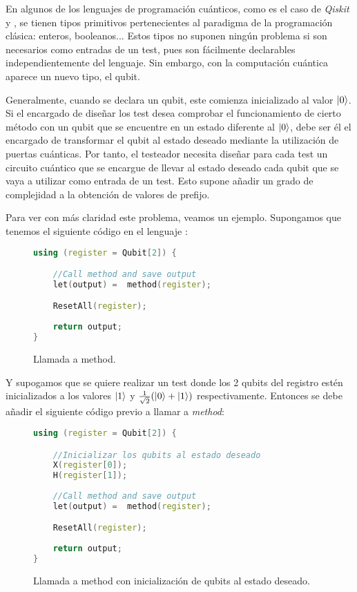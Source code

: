 En algunos de los lenguajes de programación cuánticos, como es el caso de \textit{Qiskit} y \qsh, se tienen tipos primitivos pertenecientes al paradigma de la programación clásica: enteros, booleanos... Estos tipos no suponen ningún problema si son necesarios como entradas de un test, pues son fácilmente declarables independientemente del lenguaje. Sin embargo, con la computación cuántica aparece un nuevo tipo, el qubit. 

Generalmente, cuando se declara un qubit, este comienza inicializado al valor $\left|0\right\rangle$. Si el encargado de diseñar los test desea comprobar el funcionamiento de cierto método con un qubit que se encuentre en un estado diferente al $\left|0\right\rangle$, debe ser él el encargado de transformar el qubit al estado deseado mediante la utilización de puertas cuánticas. Por tanto, el testeador necesita diseñar para cada test un circuito cuántico que se encargue de llevar al estado deseado cada qubit que se vaya a utilizar como entrada de un test. Esto supone añadir un grado de complejidad a la obtención de valores de prefijo.

Para ver con más claridad este problema, veamos un ejemplo. Supongamos que tenemos el siguiente código en el lenguaje \qsh:

\begin{figure}[htb]
\begin{lstlisting}[language=c++]
using (register = Qubit[2]) {

	//Call method and save output
	let(output) =  method(register);

	ResetAll(register);
	
	return output;
}
\end{lstlisting}
\caption{Llamada a method.}
\label{fig:code41}
\end{figure}

Y supogamos que se quiere realizar un test donde los 2 qubits del registro estén inicializados a los valores $\left|1\right\rangle$ y $\tfrac{1}{\sqrt{2}}(\left|0\right\rangle+\left|1\right\rangle)$ respectivamente. Entonces se 
debe añadir el siguiente código previo a llamar a \textit{method}:\clearpage

\begin{figure}[htb]
\begin{lstlisting}[language=c++]
using (register = Qubit[2]) {

	//Inicializar los qubits al estado deseado
	X(register[0]);
	H(register[1]);
	
	//Call method and save output
	let(output) =  method(register);

	ResetAll(register);
	
	return output;
}
\end{lstlisting}
\caption{Llamada a method con inicialización de qubits al estado deseado.}
\label{fig:code42}
\end{figure}

